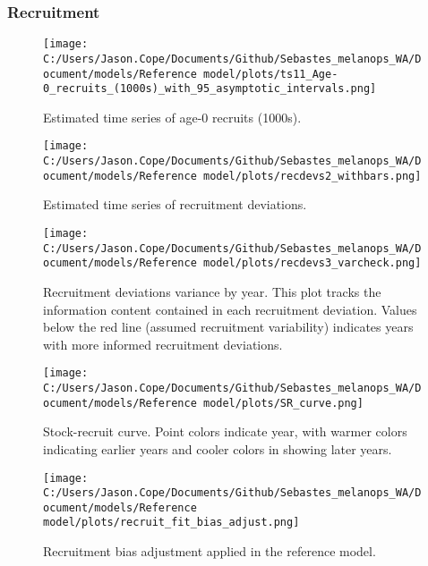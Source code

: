 \documentclass[11pt,
  english,
  letterpaper,
]{article}
\begin{document}
\hypertarget{recruitment-1}{%
\subsubsection{Recruitment}\label{recruitment-1}}

\begin{figure}
\centering
\texttt{[image: C:/Users/Jason.Cope/Documents/Github/Sebastes\_melanops\_WA/Document/models/Reference model/plots/ts11\_Age-0\_recruits\_(1000s)\_with\_95\_asymptotic\_intervals.png]}
\caption{Estimated time series of age-0 recruits (1000s).\label{fig:recruits}}
\end{figure}

\pagebreak

\begin{figure}
\centering
\texttt{[image: C:/Users/Jason.Cope/Documents/Github/Sebastes\_melanops\_WA/Document/models/Reference model/plots/recdevs2\_withbars.png]}
\caption{Estimated time series of recruitment deviations.\label{fig:rec-devs}}
\end{figure}

\pagebreak

\begin{figure}
\centering
\texttt{[image: C:/Users/Jason.Cope/Documents/Github/Sebastes\_melanops\_WA/Document/models/Reference model/plots/recdevs3\_varcheck.png]}
\caption{Recruitment deviations variance by year. This plot tracks the information content contained in each recruitment deviation. Values below the red line (assumed recruitment variability) indicates years with more informed recruitment deviations.\label{fig:rec-devs-sigmas}}
\end{figure}

\pagebreak

\begin{figure}
\centering
\texttt{[image: C:/Users/Jason.Cope/Documents/Github/Sebastes\_melanops\_WA/Document/models/Reference model/plots/SR\_curve.png]}
\caption{Stock-recruit curve. Point colors indicate year, with warmer colors indicating earlier years and cooler colors in showing later years.\label{fig:bh-curve}}
\end{figure}

\pagebreak

\begin{figure}
\centering
\texttt{[image: C:/Users/Jason.Cope/Documents/Github/Sebastes\_melanops\_WA/Document/models/Reference model/plots/recruit\_fit\_bias\_adjust.png]}
\caption{Recruitment bias adjustment applied in the reference model.\label{fig:bias-adj}}
\end{figure}
\end{document}
